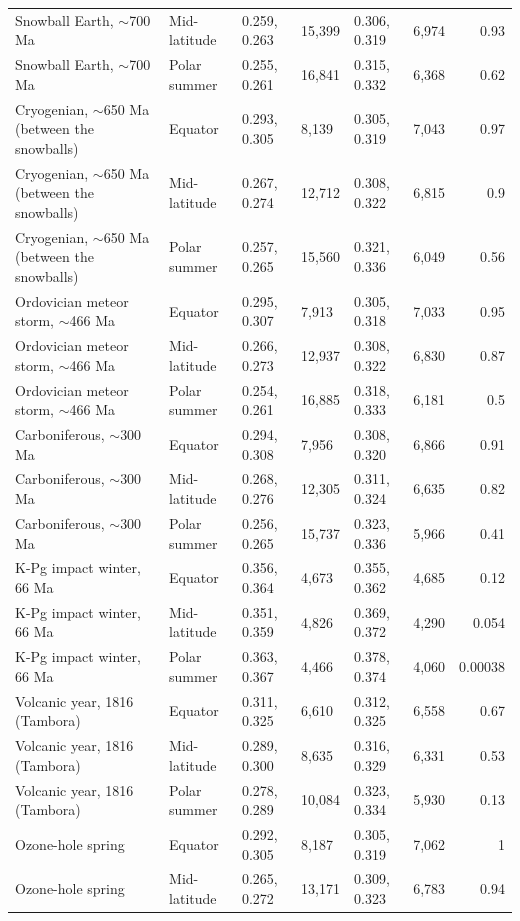 \documentclass[9pt,twocolumn]{extarticle}
\begin{document}
\begin{longtable}{@{}llllllr@{}}
Snowball Earth, $\sim$700 Ma & Mid-latitude & 0.259, 0.263 & 15,399 & 0.306, 0.319 & 6,974 & 0.93 \\
Snowball Earth, $\sim$700 Ma & Polar summer & 0.255, 0.261 & 16,841 & 0.315, 0.332 & 6,368 & 0.62 \\
Cryogenian, $\sim$650 Ma (between the snowballs) & Equator & 0.293, 0.305 & 8,139 & 0.305, 0.319 & 7,043 & 0.97 \\
Cryogenian, $\sim$650 Ma (between the snowballs) & Mid-latitude & 0.267, 0.274 & 12,712 & 0.308, 0.322 & 6,815 & 0.9 \\
Cryogenian, $\sim$650 Ma (between the snowballs) & Polar summer & 0.257, 0.265 & 15,560 & 0.321, 0.336 & 6,049 & 0.56 \\
Ordovician meteor storm, $\sim$466 Ma & Equator & 0.295, 0.307 & 7,913 & 0.305, 0.318 & 7,033 & 0.95 \\
Ordovician meteor storm, $\sim$466 Ma & Mid-latitude & 0.266, 0.273 & 12,937 & 0.308, 0.322 & 6,830 & 0.87 \\
Ordovician meteor storm, $\sim$466 Ma & Polar summer & 0.254, 0.261 & 16,885 & 0.318, 0.333 & 6,181 & 0.5 \\
Carboniferous, $\sim$300 Ma & Equator & 0.294, 0.308 & 7,956 & 0.308, 0.320 & 6,866 & 0.91 \\
Carboniferous, $\sim$300 Ma & Mid-latitude & 0.268, 0.276 & 12,305 & 0.311, 0.324 & 6,635 & 0.82 \\
Carboniferous, $\sim$300 Ma & Polar summer & 0.256, 0.265 & 15,737 & 0.323, 0.336 & 5,966 & 0.41 \\
K-Pg impact winter, 66 Ma & Equator & 0.356, 0.364 & 4,673 & 0.355, 0.362 & 4,685 & 0.12 \\
K-Pg impact winter, 66 Ma & Mid-latitude & 0.351, 0.359 & 4,826 & 0.369, 0.372 & 4,290 & 0.054 \\
K-Pg impact winter, 66 Ma & Polar summer & 0.363, 0.367 & 4,466 & 0.378, 0.374 & 4,060 & 0.00038 \\
Volcanic year, 1816 (Tambora) & Equator & 0.311, 0.325 & 6,610 & 0.312, 0.325 & 6,558 & 0.67 \\
Volcanic year, 1816 (Tambora) & Mid-latitude & 0.289, 0.300 & 8,635 & 0.316, 0.329 & 6,331 & 0.53 \\
Volcanic year, 1816 (Tambora) & Polar summer & 0.278, 0.289 & 10,084 & 0.323, 0.334 & 5,930 & 0.13 \\
Ozone-hole spring & Equator & 0.292, 0.305 & 8,187 & 0.305, 0.319 & 7,062 & 1 \\
Ozone-hole spring & Mid-latitude & 0.265, 0.272 & 13,171 & 0.309, 0.323 & 6,783 & 0.94 \\

\end{longtable}
\end{document}
